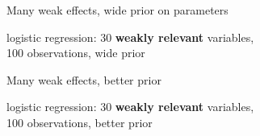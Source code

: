 \documentclass[english,t]{beamer}
\begin{document}
\begin{frame}{Many weak effects, wide prior on parameters}

  logistic regression: 30 \textbf{weakly relevant} variables, \\100
  observations, wide prior
  

\end{frame}

\begin{frame}{Many weak effects, better prior}

  logistic regression: 30 \textbf{weakly relevant} variables, \\100
  observations, better prior
  

\end{frame}
\end{document}

